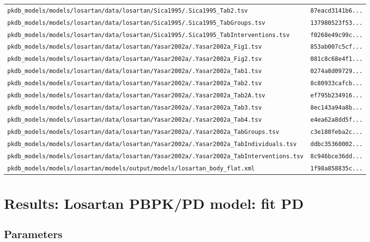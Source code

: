 \documentclass{article}
\begin{document}
\begin{longtable}{ll}
\texttt{pkdb\_models/models/losartan/data/losartan/Sica1995/.Sica1995\_Tab2.tsv} & \texttt{87eacd3141b6...} \\
\texttt{pkdb\_models/models/losartan/data/losartan/Sica1995/.Sica1995\_TabGroups.tsv} & \texttt{137980523f53...} \\
\texttt{pkdb\_models/models/losartan/data/losartan/Sica1995/.Sica1995\_TabInterventions.tsv} & \texttt{f0268e49c99c...} \\
\texttt{pkdb\_models/models/losartan/data/losartan/Yasar2002a/.Yasar2002a\_Fig1.tsv} & \texttt{853ab007c5cf...} \\
\texttt{pkdb\_models/models/losartan/data/losartan/Yasar2002a/.Yasar2002a\_Fig2.tsv} & \texttt{081c8c68e4f1...} \\
\texttt{pkdb\_models/models/losartan/data/losartan/Yasar2002a/.Yasar2002a\_Tab1.tsv} & \texttt{0274a8d09729...} \\
\texttt{pkdb\_models/models/losartan/data/losartan/Yasar2002a/.Yasar2002a\_Tab2.tsv} & \texttt{8c80933cafcb...} \\
\texttt{pkdb\_models/models/losartan/data/losartan/Yasar2002a/.Yasar2002a\_Tab2A.tsv} & \texttt{ef795b234916...} \\
\texttt{pkdb\_models/models/losartan/data/losartan/Yasar2002a/.Yasar2002a\_Tab3.tsv} & \texttt{8ec143a94a8b...} \\
\texttt{pkdb\_models/models/losartan/data/losartan/Yasar2002a/.Yasar2002a\_Tab4.tsv} & \texttt{e4ea62a8dd5f...} \\
\texttt{pkdb\_models/models/losartan/data/losartan/Yasar2002a/.Yasar2002a\_TabGroups.tsv} & \texttt{c3e180feba2c...} \\
\texttt{pkdb\_models/models/losartan/data/losartan/Yasar2002a/.Yasar2002a\_TabIndividuals.tsv} & \texttt{ddbc35360002...} \\
\texttt{pkdb\_models/models/losartan/data/losartan/Yasar2002a/.Yasar2002a\_TabInterventions.tsv} & \texttt{8c946bce36dd...} \\
\texttt{pkdb\_models/models/losartan/models/output/models/losartan\_body\_flat.xml} & \texttt{1f98a858835c...} \\
\end{longtable}

\section{Results: Losartan PBPK/PD model: fit PD}

\subsection{Parameters}
\end{document}
